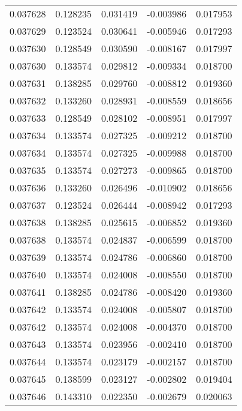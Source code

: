 \begin{tabular}{lrrrr}
0.037628    &  0.128235 &  0.031419 & -0.003986 &             0.017953 \\
0.037629    &  0.123524 &  0.030641 & -0.005946 &             0.017293 \\
0.037630    &  0.128549 &  0.030590 & -0.008167 &             0.017997 \\
0.037630    &  0.133574 &  0.029812 & -0.009334 &             0.018700 \\
0.037631    &  0.138285 &  0.029760 & -0.008812 &             0.019360 \\
0.037632    &  0.133260 &  0.028931 & -0.008559 &             0.018656 \\
0.037633    &  0.128549 &  0.028102 & -0.008951 &             0.017997 \\
0.037634    &  0.133574 &  0.027325 & -0.009212 &             0.018700 \\
0.037634    &  0.133574 &  0.027325 & -0.009988 &             0.018700 \\
0.037635    &  0.133574 &  0.027273 & -0.009865 &             0.018700 \\
0.037636    &  0.133260 &  0.026496 & -0.010902 &             0.018656 \\
0.037637    &  0.123524 &  0.026444 & -0.008942 &             0.017293 \\
0.037638    &  0.138285 &  0.025615 & -0.006852 &             0.019360 \\
0.037638    &  0.133574 &  0.024837 & -0.006599 &             0.018700 \\
0.037639    &  0.133574 &  0.024786 & -0.006860 &             0.018700 \\
0.037640    &  0.133574 &  0.024008 & -0.008550 &             0.018700 \\
0.037641    &  0.138285 &  0.024786 & -0.008420 &             0.019360 \\
0.037642    &  0.133574 &  0.024008 & -0.005807 &             0.018700 \\
0.037642    &  0.133574 &  0.024008 & -0.004370 &             0.018700 \\
0.037643    &  0.133574 &  0.023956 & -0.002410 &             0.018700 \\
0.037644    &  0.133574 &  0.023179 & -0.002157 &             0.018700 \\
0.037645    &  0.138599 &  0.023127 & -0.002802 &             0.019404 \\
0.037646    &  0.143310 &  0.022350 & -0.002679 &             0.020063 \\

\end{tabular}
